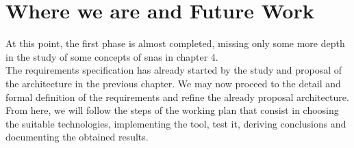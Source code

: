 \section{Where we are and Future Work}

At this point, the first phase is almost completed, missing only some more depth in the study of some concepts of \glspl{sna} in chapter 4.\\
\indent The requirements specification has already started by the study and proposal of the architecture in the previous chapter. We may now proceed to the detail and formal definition of the requirements and refine the already proposal architecture. From here, we will follow the steps of the working plan that consist in choosing the suitable technologies, implementing the tool, test it, deriving conclusions and documenting the obtained results.
